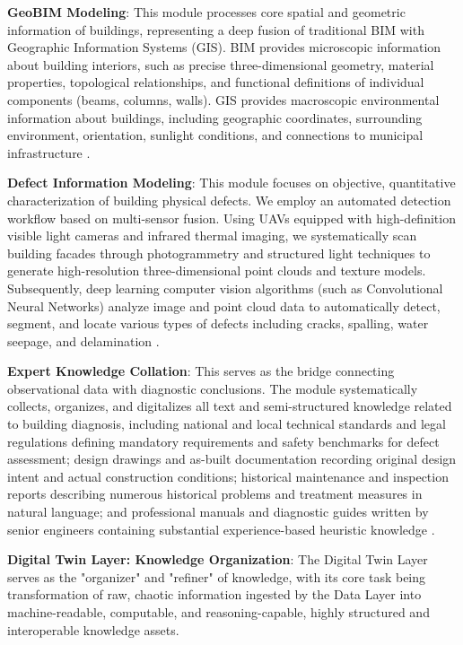\textbf{GeoBIM Modeling}: This module processes core spatial and geometric information of buildings, representing a deep fusion of traditional BIM with Geographic Information Systems (GIS). BIM provides microscopic information about building interiors, such as precise three-dimensional geometry, material properties, topological relationships, and functional definitions of individual components (beams, columns, walls). GIS provides macroscopic environmental information about buildings, including geographic coordinates, surrounding environment, orientation, sunlight conditions, and connections to municipal infrastructure \cite{boje2020towards}.

\textbf{Defect Information Modeling}: This module focuses on objective, quantitative characterization of building physical defects. We employ an automated detection workflow based on multi-sensor fusion. Using UAVs equipped with high-definition visible light cameras and infrared thermal imaging, we systematically scan building facades through photogrammetry and structured light techniques to generate high-resolution three-dimensional point clouds and texture models. Subsequently, deep learning computer vision algorithms (such as Convolutional Neural Networks) analyze image and point cloud data to automatically detect, segment, and locate various types of defects including cracks, spalling, water seepage, and delamination \cite{spencer2019advances}.

\textbf{Expert Knowledge Collation}: This serves as the bridge connecting observational data with diagnostic conclusions. The module systematically collects, organizes, and digitalizes all text and semi-structured knowledge related to building diagnosis, including national and local technical standards and legal regulations defining mandatory requirements and safety benchmarks for defect assessment; design drawings and as-built documentation recording original design intent and actual construction conditions; historical maintenance and inspection reports describing numerous historical problems and treatment measures in natural language; and professional manuals and diagnostic guides written by senior engineers containing substantial experience-based heuristic knowledge \cite{hamdan2021semantic}.

\textbf{Digital Twin Layer: Knowledge Organization}: The Digital Twin Layer serves as the "organizer" and "refiner" of knowledge, with its core task being transformation of raw, chaotic information ingested by the Data Layer into machine-readable, computable, and reasoning-capable, highly structured and interoperable knowledge assets.

